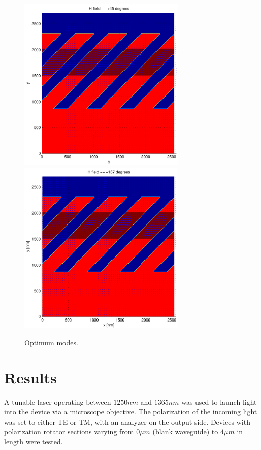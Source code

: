 \begin{figure}[htbp]
  \begin{center}
    \includegraphics[width=8cm]{pics/polrot_optimum_1}
    \includegraphics[width=8cm]{pics/polrot_optimum_2}
  \end{center}
  \caption{Optimum modes.}
  \label{fig:polrot_optimum}
\end{figure}








\section{Results}

A tunable laser operating between $1250 nm$ and $1365 nm$ was used to
launch light into the device via a microscope objective. The
polarization of the incoming light was set to either TE or TM, with an
analyzer on the output side. Devices with polarization rotator
sections varying from $0 \mu m$ (blank waveguide) to $4 \mu m$ in
length were tested.

